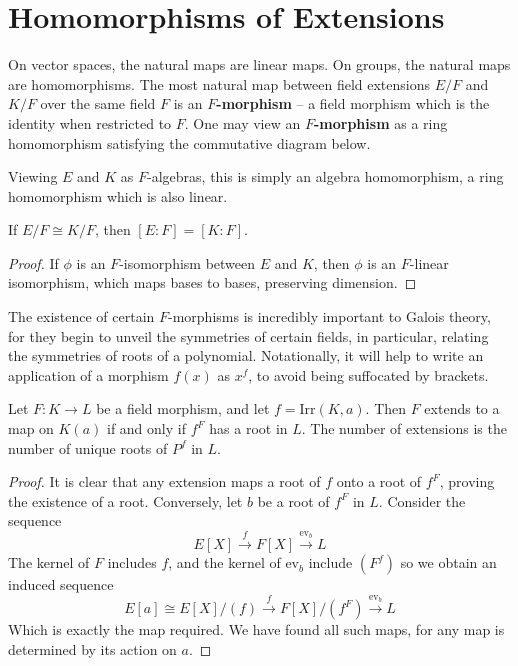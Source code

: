 \section{Homomorphisms of Extensions}

On vector spaces, the natural maps are linear maps. On groups, the natural maps are homomorphisms. The most natural map between field extensions $E/F$ and $K/F$ over the same field $F$ is an {\bf $F$-morphism} -- a field morphism which is the identity when restricted to $F$. One may view an {\bf $F$-morphism} as a ring homomorphism satisfying the commutative diagram below.
%
\begin{center}
\end{center}
%
Viewing $E$ and $K$ as $F$-algebras, this is simply an algebra homomorphism, a ring homomorphism which is also linear.

\begin{lemma}
    If $E/F \cong K/F$, then $[E:F] = [K:F]$.
\end{lemma}
\begin{proof}
    If $\phi$ is an $F$-isomorphism between $E$ and $K$, then $\phi$ is an $F$-linear isomorphism, which maps bases to bases, preserving dimension.
\end{proof}

The existence of certain $F$-morphisms is incredibly important to Galois theory, for they begin to unveil the symmetries of certain fields, in particular, relating the symmetries of roots of a polynomial. Notationally, it will help to write an application of a morphism $f(x)$ as $x^f$, to avoid being suffocated by brackets.

\begin{lemma}
    Let $F:K \to L$ be a field morphism, and let $f = \text{Irr}(K,a)$. Then $F$ extends to a map on $K(a)$ if and only if $f^F$ has a root in $L$. The number of extensions is the number of unique roots of $P^f$ in $L$.
\end{lemma}
\begin{proof}
    It is clear that any extension maps a root of $f$ onto a root of $f^F$, proving the existence of a root. Conversely, let $b$ be a root of $f^F$ in $L$. Consider the sequence
    \[ E[X] \xrightarrow{f} F[X] \xrightarrow{\text{ev}_b} L \]
    The kernel of $F$ includes $f$, and the kernel of $\text{ev}_b$ include $(F^f)$ so we obtain an induced sequence
    \[ E[a] \cong E[X]/(f) \xrightarrow{f} F[X]/(f^F) \xrightarrow{\text{ev}_b} L \]
    Which is exactly the map required. We have found all such maps, for any map is determined by its action on $a$.
\end{proof}

